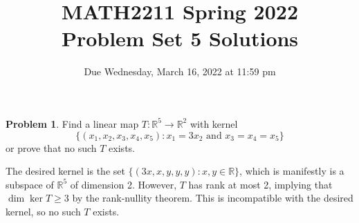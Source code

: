 \documentclass[11pt,oneside]{amsart}
\title{MATH2211 Spring 2022\\
Problem Set 5 Solutions}
\author{Due Wednesday, March 16, 2022 at 11:59 pm}
\theoremstyle{definition}
\newtheorem{problem}{Problem}
\newcommand{\bR}{\mathbb{R}}
\begin{document}
    \maketitle
    
    \begin{problem}
        Find a linear map $T\colon\bR^5\to\bR^2$ with kernel
        \[\{(x_1, x_2, x_3, x_4, x_5): x_1=3x_2\text{ and }x_3=x_4=x_5\}\]
        or prove that no such $T$ exists.
    \end{problem}
    \begin{solution}
        The desired kernel is the set $\{(3x,x,y,y,y):x,y\in\bR\}$, which is manifestly is a subspace of $\bR^5$ of dimension 2. However, $T$ has rank at most 2, implying that $\dim\ker T\geq 3$ by the rank-nullity theorem. This is incompatible with the desired kernel, so no such $T$ exists.
    \end{solution}
    
\end{document}
